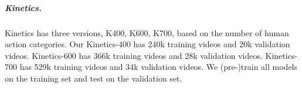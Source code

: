\subparagraph{Kinetics\cite{k400}.} Kinetics has three versions, K400, K600, K700, based on the number of human action categories. Our Kinetics-400 has 240k training videos and 20k validation videos. Kinetics-600 has 366k training videos and 28k validation videos. Kinetics-700 has 529k training videos and 34k validation videos. We (pre-)train all models on the training set and test on the validation set.